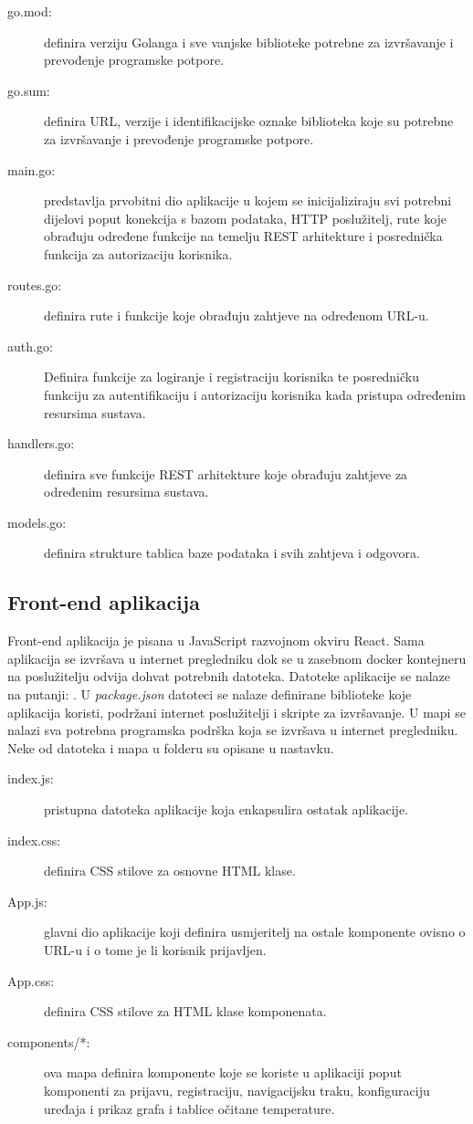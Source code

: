 \documentclass[times, utf8, diplomski]{fer}
\begin{document}
\begin{description}
    \item[go.mod:] definira verziju Golanga i sve vanjske biblioteke potrebne za izvršavanje i prevođenje programske potpore.
    \item[go.sum:] definira URL, verzije i identifikacijske oznake biblioteka koje su potrebne za izvršavanje i prevođenje programske potpore.
    \item[main.go:] predstavlja prvobitni dio aplikacije u kojem se inicijaliziraju svi potrebni dijelovi poput konekcija s bazom podataka, HTTP poslužitelj, rute koje obrađuju određene funkcije na temelju REST arhitekture i posrednička funkcija za autorizaciju korisnika. 
    \item[routes.go:] definira rute i funkcije koje obrađuju zahtjeve na određenom URL-u.
    \item[auth.go:] Definira funkcije za logiranje i registraciju korisnika te posredničku funkciju za autentifikaciju i autorizaciju korisnika kada pristupa određenim resursima sustava.
    \item[handlers.go:] definira sve funkcije REST arhitekture koje obrađuju zahtjeve za određenim resursima sustava.
    \item[models.go:] definira strukture tablica baze podataka i svih zahtjeva i odgovora.
\end{description}

\subsection{Front-end aplikacija}
Front-end aplikacija je pisana u JavaScript razvojnom okviru React. Sama aplikacija se izvršava u internet pregledniku dok se u zasebnom docker kontejneru na poslužitelju odvija dohvat potrebnih datoteka. Datoteke aplikacije se nalaze na putanji: . U \emph{package.json} datoteci se nalaze definirane biblioteke koje aplikacija koristi, podržani internet poslužitelji i skripte za izvršavanje. U  mapi se nalazi sva potrebna programska podrška koja se izvršava u internet pregledniku. Neke od datoteka i mapa u  folderu su opisane u nastavku.
\begin{description}
    \item[index.js:] pristupna datoteka aplikacije koja enkapsulira ostatak aplikacije.
    \item[index.css:] definira CSS stilove za osnovne HTML klase.
    \item[App.js:] glavni dio aplikacije koji definira usmjeritelj na ostale komponente ovisno o URL-u i o tome je li korisnik prijavljen.
    \item[App.css:] definira CSS stilove za HTML klase komponenata.
    \item[components/*:] ova mapa definira komponente koje se koriste u aplikaciji poput komponenti za prijavu, registraciju, navigacijsku traku, konfiguraciju uređaja i prikaz grafa i tablice očitane temperature.
\end{description}
\end{document}

